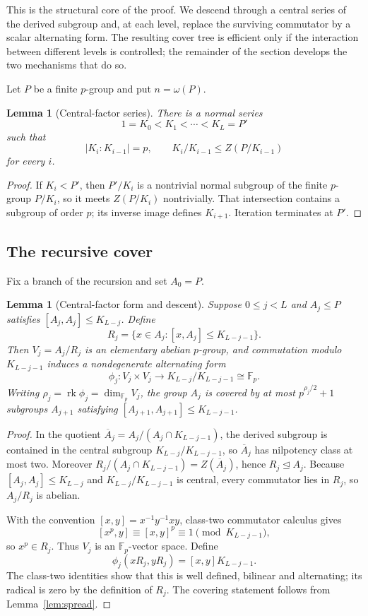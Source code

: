 \documentclass[11pt]{article}
\newtheorem{lemma}[theorem]{Lemma}
\theoremstyle{definition}
\theoremstyle{remark}
\newcommand{\F}{\mathbb{F}}
\newcommand{\rk}{\operatorname{rk}}
\begin{document}
This is the structural core of the proof. We descend through a central series of the derived subgroup and, at each level, replace the surviving commutator by a scalar alternating form. The resulting cover tree is efficient only if the interaction between different levels is controlled; the remainder of the section develops the two mechanisms that do so.

Let $P$ be a finite $p$-group and put $n=\omega(P)$.

\begin{lemma}[Central-factor series]\label{lem:central-series}
There is a normal series
\begin{equation}\label{eq:central-series}
1=K_0<K_1<\cdots<K_L=P'
\end{equation}
such that
\[
|K_i:K_{i-1}|=p,\qquad K_i/K_{i-1}\le Z(P/K_{i-1})
\]
for every $i$.
\end{lemma}

\begin{proof}
If $K_i<P'$, then $P'/K_i$ is a nontrivial normal subgroup of the finite $p$-group $P/K_i$, so it meets $Z(P/K_i)$ nontrivially. That intersection contains a subgroup of order $p$; its inverse image defines $K_{i+1}$. Iteration terminates at $P'$.
\end{proof}

\subsection{The recursive cover}

Fix a branch of the recursion and set $A_0=P$.

\begin{lemma}[Central-factor form and descent]\label{lem:descent}
Suppose $0\le j<L$ and $A_j\le P$ satisfies $[A_j,A_j]\le K_{L-j}$. Define
\[
R_j=\{x\in A_j:[x,A_j]\le K_{L-j-1}\}.
\]
Then $V_j=A_j/R_j$ is an elementary abelian $p$-group, and commutation modulo $K_{L-j-1}$ induces a nondegenerate alternating form
\[
\phi_j:V_j\times V_j\longrightarrow K_{L-j}/K_{L-j-1}\cong\F_p.
\]
Writing $\rho_j=\rk\phi_j=\dim_{\F_p}V_j$, the group $A_j$ is covered by at most $p^{\rho_j/2}+1$ subgroups $A_{j+1}$ satisfying $[A_{j+1},A_{j+1}]\le K_{L-j-1}$.
\end{lemma}

\begin{proof}
In the quotient $\overline A_j=A_j/(A_j\cap K_{L-j-1})$, the derived subgroup is contained in the central subgroup $K_{L-j}/K_{L-j-1}$, so $\overline A_j$ has nilpotency class at most two. Moreover $R_j/(A_j\cap K_{L-j-1})=Z(\overline A_j)$, hence $R_j\trianglelefteq A_j$. Because $[A_j,A_j]\le K_{L-j}$ and $K_{L-j}/K_{L-j-1}$ is central, every commutator lies in $R_j$, so $A_j/R_j$ is abelian.

With the convention $[x,y]=x^{-1}y^{-1}xy$, class-two commutator calculus gives
\[
[x^p,y]\equiv[x,y]^p\equiv1\pmod{K_{L-j-1}},
\]
so $x^p\in R_j$. Thus $V_j$ is an $\F_p$-vector space. Define
\[
\phi_j(xR_j,yR_j)=[x,y]K_{L-j-1}.
\]
The class-two identities show that this is well defined, bilinear and alternating; its radical is zero by the definition of $R_j$. The covering statement follows from Lemma~\ref{lem:spread}.
\end{proof}
\end{document}
